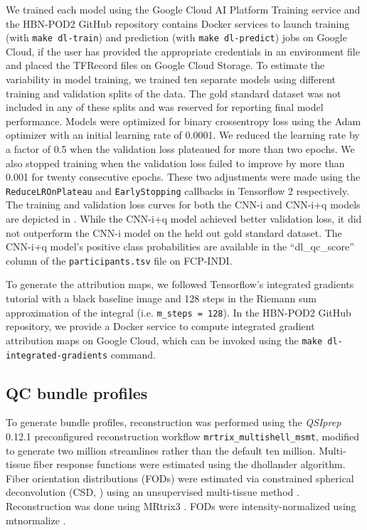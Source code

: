 \documentclass[9pt,lineno]{elife}
\begin{document}
We trained each model using the Google Cloud AI Platform Training service and
the HBN-POD2 GitHub repository contains Docker services to launch training (with
\texttt{make dl-train}) and prediction (with \texttt{make dl-predict}) jobs on
Google Cloud, if the user has provided the appropriate credentials in an
environment file and placed the TFRecord files on Google Cloud Storage. To
estimate the variability in model training, we trained ten separate models using
different training and validation splits of the data. The gold standard dataset
was not included in any of these splits and was reserved for reporting final
model performance. Models were optimized for binary crossentropy loss using the
Adam optimizer \citep{kingma2017adam} with an initial learning rate of 0.0001. We
reduced the learning rate by a factor of 0.5 when the validation loss plateaued
for more than two epochs. We also stopped training when the validation loss
failed to improve by more than 0.001 for twenty consecutive epochs. These two
adjustments were made using the \texttt{ReduceLROnPlateau} and
\texttt{EarlyStopping} callbacks in Tensorflow 2 \citep{tensorflow} respectively.
The training and validation loss curves for both the CNN-i and CNN-i+q models
are depicted in . While the CNN-i+q model achieved
better validation loss, it did not outperform the CNN-i model on the held out
gold standard dataset. The CNN-i+q model's positive class probabilities are
available in the ``dl\_qc\_score'' column of the \texttt{participants.tsv} file on
FCP-INDI.

To generate the attribution maps, we followed Tensorflow's integrated gradients
tutorial \citep{integrated-gradients-tutorial} with a black baseline image and
128 steps in the Riemann sum approximation of the integral (i.e.
\texttt{m\_steps = 128}). In the HBN-POD2 GitHub repository, we provide a Docker
service to compute integrated gradient attribution maps on Google Cloud, which
can be invoked using the \texttt{make dl-integrated-gradients} command.

\subsection{QC bundle profiles}

To generate bundle profiles, reconstruction was performed using the
\emph{QSIprep} 0.12.1 preconfigured reconstruction workflow
\texttt{mrtrix\_multishell\_msmt}, modified to generate two million streamlines
rather than the default ten million. Multi-tissue fiber response functions were
estimated using the dhollander algorithm. Fiber orientation distributions (FODs) were estimated via constrained
spherical deconvolution (CSD, \citep{originalcsd, tournier2008csd}) using an
unsupervised multi-tissue method \citep{dhollander2019response,
dhollander2016unsupervised}. Reconstruction was done using MRtrix3
\citep{mrtrix3}. FODs were intensity-normalized using mtnormalize
\citep{mtnormalize}.
\end{document}
